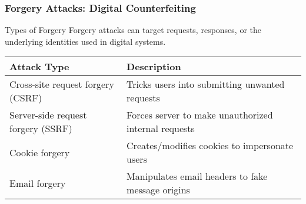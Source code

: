 \documentclass{beamer}
\begin{document}
\begin{frame}
    \frametitle{Forgery Attacks: Digital Counterfeiting}
    
    \begin{block}{Types of Forgery}
        Forgery attacks can target requests, responses, or the underlying identities used in digital systems.
    \end{block}
    
    \begin{tabular}{|p{3cm}|p{8cm}|}
        \textbf{Attack Type} & \textbf{Description} \\
        \hline
        Cross-site request forgery (CSRF) & Tricks users into submitting unwanted requests \\
        Server-side request forgery (SSRF) & Forces server to make unauthorized internal requests \\
        Cookie forgery & Creates/modifies cookies to impersonate users \\
        Email forgery & Manipulates email headers to fake message origins \\
    \end{tabular}
    
\end{frame}
\end{document}
